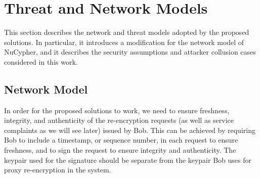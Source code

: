 \section{Threat and Network Models}
\label{threat-network-model}
This section describes the network and threat models adopted by the proposed solutions. In particular, it introduces a modification for the network model of NuCypher, and it describes the security assumptions and attacker collusion cases considered in this work.


\subsection{Network Model}
In order for the proposed solutions to work, we need to ensure freshness, integrity, and authenticity of the re-encryption requests (as well as service complaints as we will see later) issued by Bob. This can be achieved by requiring Bob to include a timestamp, or sequence number, in each request to ensure freshness, and to sign the request to ensure integrity and authenticity. The keypair used for the signature should be separate from the keypair Bob uses for proxy re-encryption in the system. 


